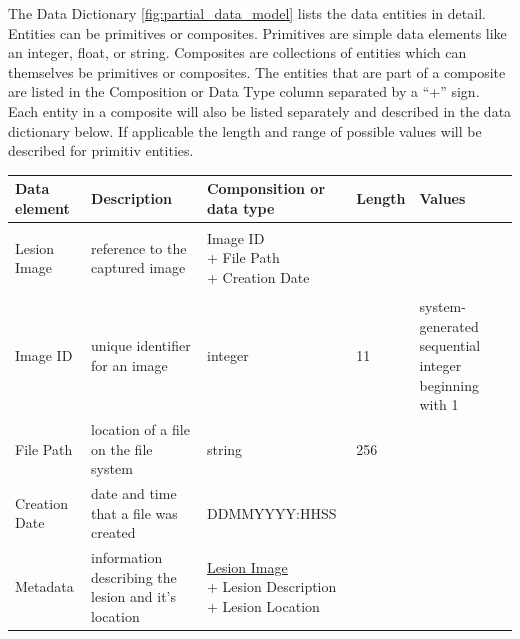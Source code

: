         The Data Dictionary \ref{fig:partial_data_model} lists the data entities in detail. Entities can be primitives or composites. Primitives are simple data elements like an integer, float, or string. Composites are collections of entities which can themselves be primitives or composites. The entities that are part of a composite are listed in the Composition or Data Type column separated by a “+” sign. Each entity in a composite will also be listed separately and described in the data dictionary below. If applicable the length and range of possible values will be described for primitiv entities.

                {\small
                \begin{longtable}[H]{ | p{2.5cm} | p{2.5cm} | p{2.5cm} | p{1.0cm} | p{2.5cm} | }

                    \hline
                    \textbf{Data element} & \textbf{Description} & \textbf{Componsition or data type} & \textbf{Length} & \textbf{Values} \\ \hline

                    \hypertarget{lesion_image}{Lesion Image} & reference to the captured image &

                        \specialcell[t]{Image ID
                           \\ + File Path
                           \\ + Creation Date
                        }

                     & & \\ \hline

                    Image ID & unique identifier for an image &
                    integer & 11 & system-generated sequential integer beginning with 1 \\ \hline

                    File Path & location of a file on the file system &
                    string & 256 &  \\ \hline

                    Creation Date & date and time that a file was created &
                    DDMMYYYY:HHSS &  &  \\ \hline

                    Metadata & information describing the lesion and it's location &

                        \specialcell[t]{\hyperlink{lesion_image}{Lesion Image}
                           \\ + Lesion Description
                           \\ + Lesion Location
                        }


\end{longtable}}
